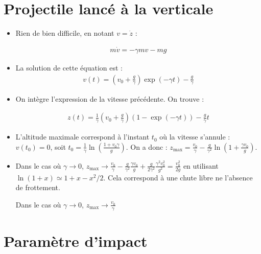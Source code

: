 \documentclass{report}
\begin{document}
\newpage

\section*{Projectile lancé à la verticale}

\begin{itemize}
\item Rien de bien difficile, en notant $v=\dot{z}$ :

\begin{align*}
	m\dot{v}=-\gamma mv-mg
\end{align*}

\item
La solution de cette équation est :
\begin{align*}
	v(t) = \left(v_0+\frac{g}{\gamma} \right)\exp\left(-\gamma t\right)-\frac{g}{\gamma}  
\end{align*}

\item On intègre l'expression de la vitesse précédente. On trouve :

\begin{align*}
	z(t) = \frac{1}{\gamma}\left(v_0+\frac{g}{\gamma} \right) \left(1-\exp(-\gamma t) \right) -\frac{g}{\gamma}t
\end{align*}
\item L'altitude maximale correspond à l'instant $t_0$ où la vitesse s'annule : $v(t_0)=0$, soit $t_0 = \frac{1}{\gamma}\ln\left(\frac{1+v_0\gamma}{g} \right) $. On a donc :
$z_\mathrm{max}=\frac{v_0}{\gamma}-\frac{g}{\gamma^2}\ln\left( 1+\frac{\gamma v_0}{g}\right).$

\item Dans le cas où $\gamma\rightarrow0$, $z_\mathrm{max}\rightarrow\frac{v_0}{\gamma}-\frac{g}{\gamma^2}\frac{\gamma v_0}{g}+\frac{g}{2\gamma^2}\frac{\gamma^2 v_0^2}{g^2}=\frac{ v_0^2}{2g}$ en utilisant $\ln(1+x)\simeq 1+x-x^2/2$. Cela correspond à une chute libre ne l'absence de frottement. 

Dans le cas où $\gamma\rightarrow0$, $z_\mathrm{max}\rightarrow\frac{v_0}{\gamma}$

\end{itemize}

\section*{Paramètre d'impact}
\end{document}
